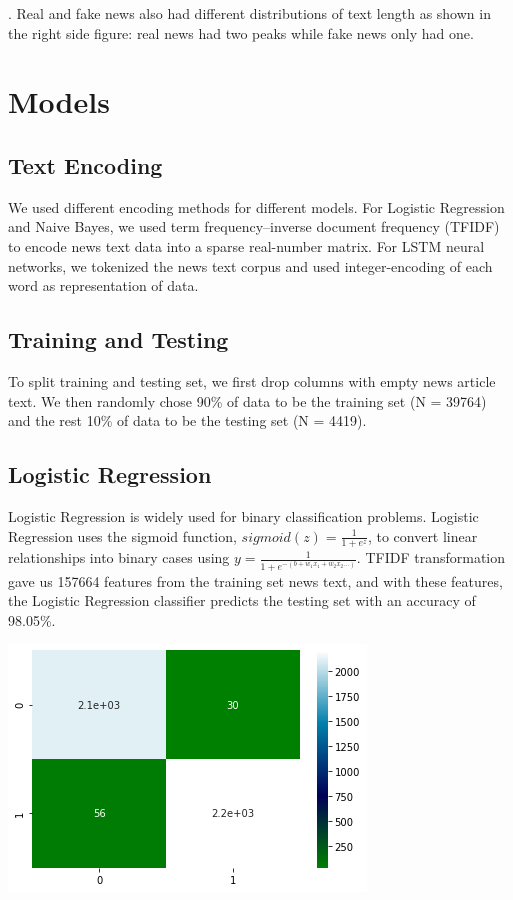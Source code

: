 \documentclass{article}
\begin{document}
\begin{multicols}{2}
. Real and fake news also had different distributions of text length as shown in the right side figure: real news had two peaks while fake news only had one.  

\section{Models}
\subsection{Text Encoding}
We used different encoding methods for different models. 
For Logistic Regression and Naive Bayes, we used term frequency–inverse document frequency (TFIDF) to encode news text data into a sparse real-number matrix. For LSTM neural networks, we tokenized the news text corpus and used integer-encoding of each word as representation of data.

\subsection{Training and Testing}
To split training and testing set, we first drop columns with empty news article text. We then randomly chose 90\% of data to be the training set (N = 39764) and the rest 10\% of data to be the testing set (N = 4419).

\subsection{Logistic Regression}
Logistic Regression is widely used for binary classification problems. Logistic Regression uses the sigmoid function, $sigmoid(z)=  \frac{1}{1+e^{z}}$, to convert linear relationships into binary cases using $y=\frac{1}{1+e^{-(b+w_1x_1+w_2x_2...)}}$. TFIDF transformation gave us 157664 features from the training set news text, and with these features, the Logistic Regression classifier predicts the testing set with an accuracy of 98.05\%.

\includegraphics[scale=0.6]{images/lrcm.png}


\end{multicols}
\end{document}
